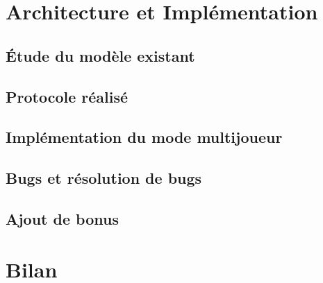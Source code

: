 \documentclass[12pt]{article}
\begin{document}
\section{Architecture et Implémentation}
\subsection{Étude du modèle existant}

\subsection{Protocole réalisé}

\subsection{Implémentation du mode multijoueur}

\subsection{Bugs et résolution de bugs}

\subsection{Ajout de bonus}
\newpage

\section{Bilan}
\end{document}
